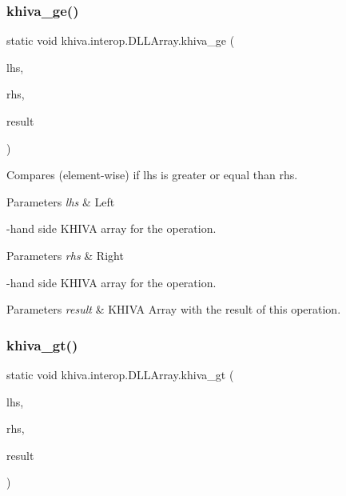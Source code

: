 \subsubsection{\texorpdfstring{khiva\+\_\+ge()}{khiva\_ge()}}
{\footnotesize\ttfamily static void khiva.\+interop.\+D\+L\+L\+Array.\+khiva\+\_\+ge (\begin{DoxyParamCaption}\item[{\mbox{[}\+In\mbox{]} ref Int\+Ptr}]{lhs,  }\item[{\mbox{[}\+In\mbox{]} ref Int\+Ptr}]{rhs,  }\item[{\mbox{[}\+Out\mbox{]} out Int\+Ptr}]{result }\end{DoxyParamCaption})\hspace{0.3cm}{\ttfamily [static]}}



Compares (element-\/wise) if lhs is greater or equal than rhs.


\begin{DoxyParams}{Parameters}
{\em lhs} & Left\\
\hline
\end{DoxyParams}
-\/hand side K\+H\+I\+VA array for the operation. 
\begin{DoxyParams}{Parameters}
{\em rhs} & Right\\
\hline
\end{DoxyParams}
-\/hand side K\+H\+I\+VA array for the operation. 
\begin{DoxyParams}{Parameters}
{\em result} & K\+H\+I\+VA Array with the result of this operation.\\
\hline
\end{DoxyParams}
\mbox{\label{classkhiva_1_1interop_1_1_d_l_l_array_a3ef02ed8d73c45dcc4dff13579567bdf}} 
\subsubsection{\texorpdfstring{khiva\+\_\+gt()}{khiva\_gt()}}
{\footnotesize\ttfamily static void khiva.\+interop.\+D\+L\+L\+Array.\+khiva\+\_\+gt (\begin{DoxyParamCaption}\item[{\mbox{[}\+In\mbox{]} ref Int\+Ptr}]{lhs,  }\item[{\mbox{[}\+In\mbox{]} ref Int\+Ptr}]{rhs,  }\item[{\mbox{[}\+Out\mbox{]} out Int\+Ptr}]{result }\end{DoxyParamCaption})\hspace{0.3cm}{\ttfamily [static]}}



